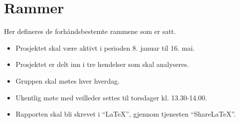 \section{Rammer}
\label{sec:rammer}
Her defineres de forhåndsbestemte rammene som er satt. 

\begin{itemize}
    \item Prosjektet skal være aktivt i perioden 8. januar til 16. mai.
    \item Prosjektet er delt inn i tre hendelser som skal analyseres.
    \item Gruppen skal møtes hver hverdag.
    \item Ukentlig møte med veilleder settes til torsdager kl. 13.30-14.00.
    \item Rapporten skal bli skrevet i ``LaTeX'', gjennom tjenesten ``ShareLaTeX''.
\end{itemize}